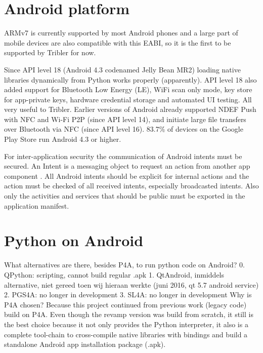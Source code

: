 \section{Android platform}

ARMv7 is currently supported by most Android phones and a large part of mobile devices are also compatible with this EABI, so it is the first to be supported by Tribler for now.

Since API level 18 (Android 4.3 codenamed Jelly Bean MR2) loading native libraries dynamically from Python works properly (apparently).
API level 18 also added support for Bluetooth Low Energy (LE), WiFi scan only mode, key store for app-private keys, hardware credential storage and automated UI testing.
All very useful to Tribler.
Earlier versions of Android already supported NDEF Push with NFC and Wi-Fi P2P (since API level 14), and initiate large file transfers over Bluetooth via NFC (since API level 16).
83.7\% of devices on the Google Play Store run Android 4.3 or higher.


For inter-application security the communication of Android intents must be secured.
An Intent is a messaging object to request an action from another app component \cite{android-intents}.
All Android intents should be explicit for internal actions and the action must be checked of all received intents, especially broadcasted intents. \cite{paper Analysing inter-application communication in Android}
Also only the activities and services that should be public must be exported in the application manifest.


\section{Python on Android}
What alternatives are there, besides P4A, to run python code on Android?
0. QPython: scripting, cannot build regular .apk
1. QtAndroid, inmiddels alternative, niet gereed toen wij hieraan werkte (juni 2016, qt 5.7 android service)
2. PGS4A: no longer in development
3. SL4A: no longer in development
Why is P4A chosen?
Because this project continued from previous work (legacy code) build on P4A.
Even though the revamp version was build from scratch, it still is the best choice because it not only provides the Python interpreter, it also is a complete tool-chain to cross-compile native libraries with bindings and build a standalone Android app installation package (.apk).


